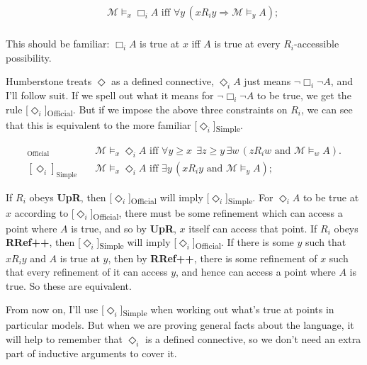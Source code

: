 \documentclass[
  10.5pt,
  twoside]{article}
\begin{document}
\begin{align*}
[\Box_i] \quad & \mathcal{M} \models_x \Box_i A \text{ iff } \forall y \, (x R_i y \Rightarrow \mathcal{M} \models_y A); \\
\end{align*}

This should be familiar: \(\Box_i A\) is true at \(x\) iff \(A\) is true
at every \(R_i\)-accessible possibility.

Humberstone treats \(\Diamond\) as a defined connective,
\(\Diamond_i A\) just means \(\neg \Box_i \neg A\), and I'll follow
suit. If we spell out what it means for \(\neg \Box_i \neg A\) to be
true, we get the rule {[}\(\Diamond_i\){]}\textsubscript{Official}. But
if we impose the above three constraints on \(R_i\), we can see that
this is equivalent to the more familiar
{[}\(\Diamond_i\){]}\textsubscript{Simple}.

\begin{align*}
[\Diamond_i]_{\text{Official}} \quad & \mathcal{M} \models_x \Diamond_i A \text{ iff } \forall y \geqslant x \;\, \exists z \geqslant y \, \exists w \, (z R_i w \text{ and } \mathcal{M} \models_w A). \\
[\Diamond_i]_{\text{Simple}} \quad & \mathcal{M} \models_x \Diamond_i A \text{ iff } \exists y \, (x R_i y \text{ and } \mathcal{M} \models_y A);
\end{align*}

If \(R_i\) obeys \textbf{UpR}, then
{[}\(\Diamond_i\){]}\textsubscript{Official} will imply
{[}\(\Diamond_i\){]}\textsubscript{Simple}. For \(\Diamond_i A\) to be
true at \(x\) according to {[}\(\Diamond_i\){]}\textsubscript{Official},
there must be some refinement which can access a point where \(A\) is
true, and so by \textbf{UpR}, \(x\) itself can access that point. If
\(R_i\) obeys \textbf{RRef++}, then
{[}\(\Diamond_i\){]}\textsubscript{Simple} will imply
{[}\(\Diamond_i\){]}\textsubscript{Official}. If there is some \(y\)
such that \(xR_iy\) and \(A\) is true at \(y\), then by \textbf{RRef++},
there is some refinement of \(x\) such that every refinement of it can
access \(y\), and hence can access a point where \(A\) is true. So these
are equivalent.

From now on, I'll use {[}\(\Diamond_i\){]}\textsubscript{Simple} when
working out what's true at points in particular models. But when we are
proving general facts about the language, it will help to remember that
\(\Diamond_i\) is a defined connective, so we don't need an extra part
of inductive arguments to cover it.
\end{document}
